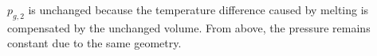 \( p_{g,2} \) is unchanged because the temperature difference caused by melting is compensated by the unchanged volume. From above, the pressure remains constant due to the same geometry.